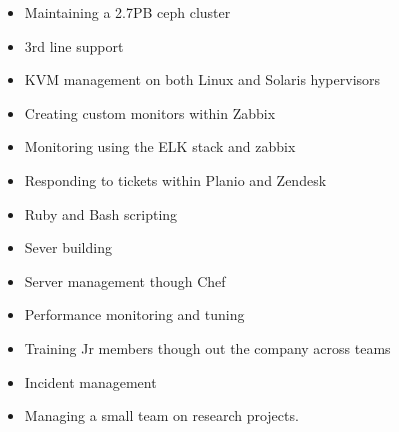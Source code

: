 \documentclass[]{friggeri-cv-a4}
\begin{document}
\begin{entrylist}
{\begin{itemize}
      \item Maintaining a 2.7PB ceph cluster
      \item 3rd line support
      \item KVM management on both Linux and Solaris hypervisors
      \item Creating custom monitors within Zabbix
      \item Monitoring using the ELK stack and zabbix
      \item Responding to tickets within Planio and Zendesk
      \item Ruby and Bash scripting
      \item Sever building
      \item Server management though Chef
      \item Performance monitoring and tuning
      \item Training Jr members though out the company across teams
      \item Incident management
      \item Managing a small team on research projects.
    \end{itemize}
    }
 \end{entrylist}
\end{document}
